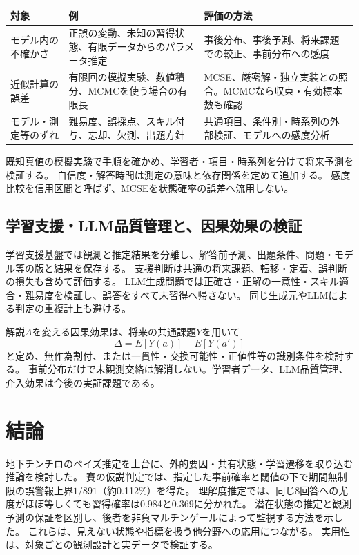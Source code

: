\documentclass[10pt,a4paper]{article}
\begin{document}
\begin{center}
\label{tab:uncertainty}
\small
\begin{tabular}{@{}>{\raggedright\arraybackslash}p{34mm}>{\raggedright\arraybackslash}p{54mm}>{\raggedright\arraybackslash}p{64mm}@{}}
\toprule 対象 & 例 & 評価の方法\\
\midrule
モデル内の不確かさ & 正誤の変動、未知の習得状態、有限データからのパラメータ推定 & 事後分布、事後予測、将来課題での較正、事前分布への感度\\
近似計算の誤差 & 有限回の模擬実験、数値積分、MCMCを使う場合の有限長 & MCSE、厳密解・独立実装との照合。MCMCなら収束・有効標本数も確認\\
モデル・測定等のずれ & 難易度、誤採点、スキル付与、忘却、欠測、出題方針 & 共通項目、条件別・時系列の外部検証、モデルへの感度分析\\
\bottomrule
\end{tabular}
\end{center}
既知真値の模擬実験で手順を確かめ、学習者・項目・時系列を分けて将来予測を検証する。
自信度・解答時間は測定の意味と依存関係を定めて追加する。
感度比較を信用区間と呼ばず、MCSEを状態確率の誤差へ流用しない。

\subsection{学習支援・LLM品質管理と、因果効果の検証}
学習支援基盤では観測と推定結果を分離し、解答前予測、出題条件、問題・モデル等の版と結果を保存する。
支援判断は共通の将来課題、転移・定着、誤判断の損失も含めて評価する。
LLM生成問題では正確さ・正解の一意性・スキル適合・難易度を検証し、誤答をすべて未習得へ帰さない。
同じ生成元やLLMによる判定の重複計上も避ける。

解説$A$を変える因果効果は、将来の共通課題$Y$を用いて
\begin{equation}
 \Delta=E[Y(a)]-E[Y(a')]
\end{equation}
と定め、無作為割付、または一貫性・交換可能性・正値性等の識別条件を検討する\cite{causal}。
事前分布だけで未観測交絡は解消しない。学習者データ、LLM品質管理、介入効果は今後の実証課題である。

\section{結論}
地下チンチロのベイズ推定を土台に、外的要因・共有状態・学習遷移を取り込む推論を検討した。
賽の仮説判定では、指定した事前確率と閾値の下で期間無制限の誤警報上界$1/891$（約0.112\%）を得た。
理解度推定では、同じ8回答への尤度がほぼ等しくても習得確率は0.984と0.369に分かれた。
潜在状態の推定と観測予測の保証を区別し、後者を非負マルチンゲールによって監視する方法を示した。
これらは、見えない状態や指標を扱う他分野への応用につながる。
実用性は、対象ごとの観測設計と実データで検証する。
\end{document}
